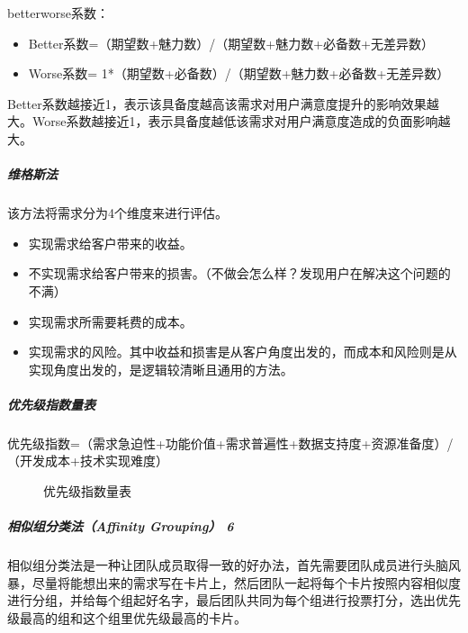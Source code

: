 \documentclass[letterpaper,11pt,english]{sphinxmanual}
\begin{document}
better\sphinxhyphen{}worse系数：
\begin{itemize}
\item {} 
Better系数=（期望数+魅力数）/（期望数+魅力数+必备数+无差异数）

\item {} 
Worse系数= \sphinxhyphen{}1*（期望数+必备数）/（期望数+魅力数+必备数+无差异数）

\end{itemize}

Better系数越接近1，表示该具备度越高该需求对用户满意度提升的影响效果越大。Worse系数越接近\sphinxhyphen{}1，表示具备度越低该需求对用户满意度造成的负面影响越大。



\subparagraph{维格斯法}
\label{\detokenize{chapter_knowledge/upgrade_manage:id18}}
该方法将需求分为4个维度来进行评估。
\begin{itemize}
\item {} 
实现需求给客户带来的收益。

\item {} 
不实现需求给客户带来的损害。（不做会怎么样？发现用户在解决这个问题的不满）

\item {} 
实现需求所需要耗费的成本。

\item {} 
实现需求的风险。其中收益和损害是从客户角度出发的，而成本和风险则是从实现角度出发的，是逻辑较清晰且通用的方法。

\end{itemize}


\subparagraph{优先级指数量表}
\label{\detokenize{chapter_knowledge/upgrade_manage:id19}}
优先级指数=（需求急迫性+功能价值+需求普遍性+数据支持度+资源准备度）/（开发成本+技术实现难度）

\begin{figure}[H]
\centering
\capstart

\noindent{}
\caption{优先级指数量表}\label{\detokenize{chapter_knowledge/upgrade_manage:id25}}\end{figure}


\subparagraph{相似组分类法（Affinity Grouping） 6\sphinxfootnotemark[587]}
\label{\detokenize{chapter_knowledge/upgrade_manage:affinity-grouping-6}}%
\begin{footnotetext}[587]\sphinxAtStartFootnote
{}
%
\end{footnotetext}\ignorespaces 
相似组分类法是一种让团队成员取得一致的好办法，首先需要团队成员进行头脑风暴，尽量将能想出来的需求写在卡片上，然后团队一起将每个卡片按照内容相似度进行分组，并给每个组起好名字，最后团队共同为每个组进行投票打分，选出优先级最高的组和这个组里优先级最高的卡片。
\end{document}
